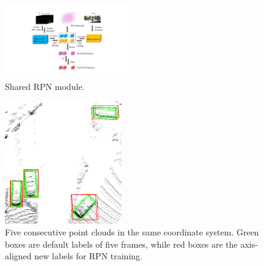 \documentclass[a4paper, 10pt, conference]{ieeeconf}      %
\begin{document}
\begin{figure}
	\vspace{-0.6cm}
	\rule{0pt}{1ex}
	\begin{center}
		\includegraphics[trim={7cm, 2cm, 8cm, 1.8cm}, clip,width=0.5\textwidth]{images/rpn.pdf}
	\end{center}
	\caption{Shared RPN module.}
	\label{fig:rpn}
	\vspace{-0.5cm}
\end{figure}

\begin{figure}
	\vspace{-0.6cm}
	\rule{0pt}{1ex}
	\begin{center}
		\includegraphics[width=0.45\textwidth]{images/integrated_boxes.png}
	\end{center}
	\caption{Five consecutive point clouds in the same coordinate system. Green boxes are default labels of five frames, while red boxes are the axis-aligned new labels for RPN training.}
	\label{fig:integrated_boxes}
	\vspace{-0.6cm}
\end{figure}
\end{document}
